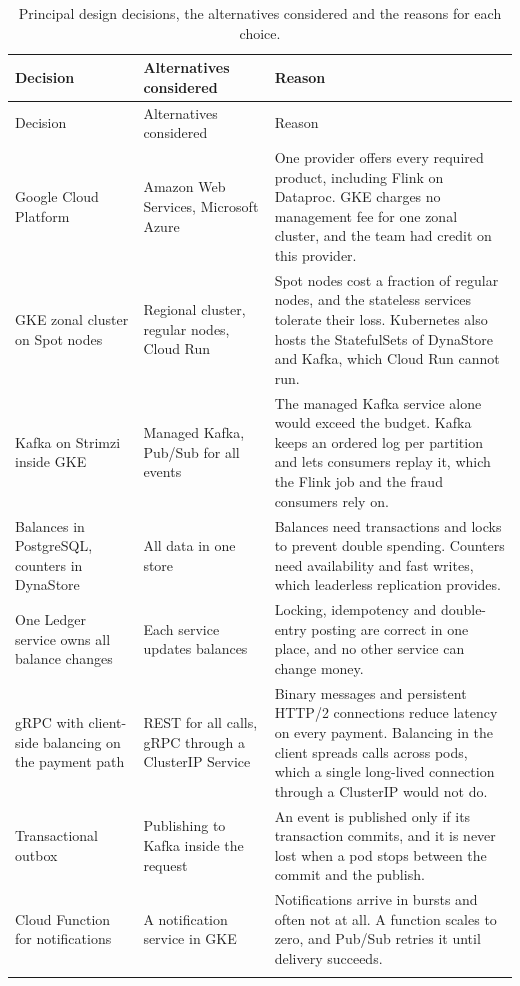 \documentclass[11pt,a4paper]{article}
\begin{document}
\begin{longtable}{@{}L{3.2cm}L{3.6cm}L{7.3cm}@{}}
\caption{Principal design decisions, the alternatives considered and the reasons for each choice.}\label{tab:rationale}\\
\toprule
Decision & Alternatives considered & Reason \\
\midrule\endfirsthead
\toprule
Decision & Alternatives considered & Reason \\
\midrule\endhead
Google Cloud Platform & Amazon Web Services, Microsoft Azure & One provider offers every required product, including Flink on Dataproc. GKE charges no management fee for one zonal cluster, and the team had credit on this provider. \\ \addlinespace[3pt]
GKE zonal cluster on Spot nodes & Regional cluster, regular nodes, Cloud Run & Spot nodes cost a fraction of regular nodes, and the stateless services tolerate their loss. Kubernetes also hosts the StatefulSets of DynaStore and Kafka, which Cloud Run cannot run. \\ \addlinespace[3pt]
Kafka on Strimzi inside GKE & Managed Kafka, Pub/Sub for all events & The managed Kafka service alone would exceed the budget. Kafka keeps an ordered log per partition and lets consumers replay it, which the Flink job and the fraud consumers rely on. \\ \addlinespace[3pt]
Balances in PostgreSQL, counters in DynaStore & All data in one store & Balances need transactions and locks to prevent double spending. Counters need availability and fast writes, which leaderless replication provides. \\ \addlinespace[3pt]
One Ledger service owns all balance changes & Each service updates balances & Locking, idempotency and double-entry posting are correct in one place, and no other service can change money. \\ \addlinespace[3pt]
gRPC with client-side balancing on the payment path & REST for all calls, gRPC through a ClusterIP Service & Binary messages and persistent HTTP/2 connections reduce latency on every payment. Balancing in the client spreads calls across pods, which a single long-lived connection through a ClusterIP would not do. \\ \addlinespace[3pt]
Transactional outbox & Publishing to Kafka inside the request & An event is published only if its transaction commits, and it is never lost when a pod stops between the commit and the publish. \\ \addlinespace[3pt]
Cloud Function for notifications & A notification service in GKE & Notifications arrive in bursts and often not at all. A function scales to zero, and Pub/Sub retries it until delivery succeeds. \\ \addlinespace[3pt]

\end{longtable}
\end{document}
